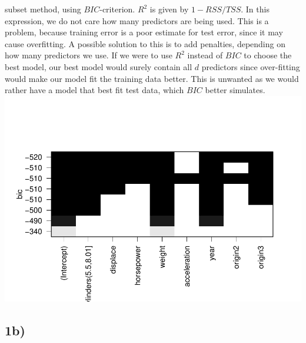 \documentclass[]{article}
\begin{document}
\begin{itemize}
  subset method, using \(BIC\)-criterion. \(R^2\) is given by
  \(1-RSS/TSS\). In this expression, we do not care how many predictors
  are being used. This is a problem, because training error is a poor
  estimate for test error, since it may cause overfitting. A possible
  solution to this is to add penalties, depending on how many predictors
  we use. If we were to use \(R^2\) instead of \(BIC\) to choose the
  best model, our best model would surely contain all \(d\) predictors
  since over-fitting would make our model fit the training data better.
  This is unwanted as we would rather have a model that best fit test
  data, which \(BIC\) better simulates.
  \includegraphics{Project2_files/figure-latex/unnamed-chunk-1-1.pdf}
\end{itemize}

\subsection{1b)}\label{b}
\end{document}
